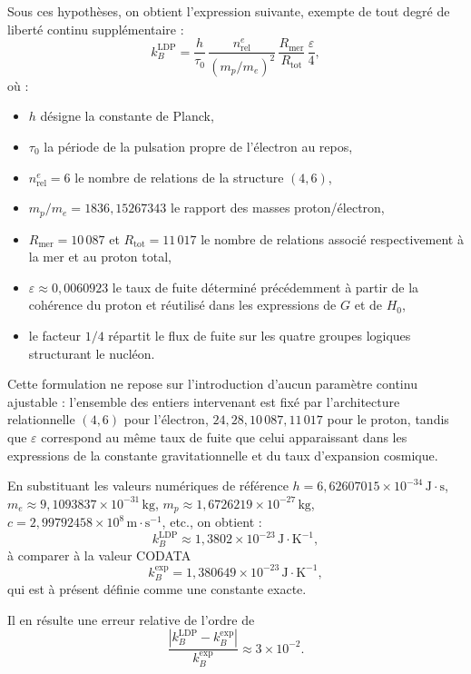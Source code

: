 \documentclass[11pt,a4paper]{article}
\begin{document}
Sous ces hypothèses, on obtient l’expression suivante, exempte de tout degré de liberté continu supplémentaire :
\[
k_B^{\mathrm{LDP}}
= \frac{h}{\tau_0}\,
  \frac{n_{\mathrm{rel}}^{e}}{\left(m_p/m_e\right)^{2}}\,
  \frac{R_{\mathrm{mer}}}{R_{\mathrm{tot}}}\,
  \frac{\varepsilon}{4},
\]
où :
\begin{itemize}
  \item \(h\) désigne la constante de Planck, 
  \item \(\tau_0\) la période de la pulsation propre de l’électron au repos,
  \item \(n_{\mathrm{rel}}^{e} = 6\) le nombre de relations de la structure \((4,6)\),
  \item \(m_p/m_e = 1836{,}15267343\) le rapport des masses proton/électron, 
  \item \(R_{\mathrm{mer}} = 10\,087\) et \(R_{\mathrm{tot}} = 11\,017\) le nombre de relations associé respectivement à la mer et au proton total,
  \item \(\varepsilon \approx 0{,}0060923\) le taux de fuite déterminé précédemment à partir de la cohérence du proton et réutilisé dans les expressions de \(G\) et de \(H_0\),
  \item le facteur \(1/4\) répartit le flux de fuite sur les quatre groupes logiques structurant le nucléon.
\end{itemize}

Cette formulation ne repose sur l’introduction d’aucun paramètre continu ajustable : l’ensemble des entiers intervenant est fixé par l’architecture relationnelle \((4,6)\) pour l’électron, \(24, 28, 10\,087, 11\,017\) pour le proton, tandis que \(\varepsilon\) correspond au même taux de fuite que celui apparaissant dans les expressions de la constante gravitationnelle et du taux d’expansion cosmique.

En substituant les valeurs numériques de référence \(h = 6{,}62607015\times 10^{-34}\,\mathrm{J\cdot s}\), \(m_e \approx 9{,}1093837\times 10^{-31}\,\mathrm{kg}\), \(m_p \approx 1{,}6726219\times 10^{-27}\,\mathrm{kg}\), \(c = 2{,}99792458\times 10^{8}\,\mathrm{m\cdot s^{-1}}\), etc., on obtient :
\[
k_B^{\mathrm{LDP}} \approx 1{,}3802\times 10^{-23}\,\mathrm{J\cdot K^{-1}},
\]
à comparer à la valeur CODATA
\[
k_B^{\mathrm{exp}} = 1{,}380649\times 10^{-23}\,\mathrm{J\cdot K^{-1}}, 
\]
qui est à présent définie comme une constante exacte. 

Il en résulte une erreur relative de l’ordre de
\[
\frac{\left|k_B^{\mathrm{LDP}} - k_B^{\mathrm{exp}}\right|}{k_B^{\mathrm{exp}}}
\approx 3\times 10^{-2}.
\]
\end{document}

